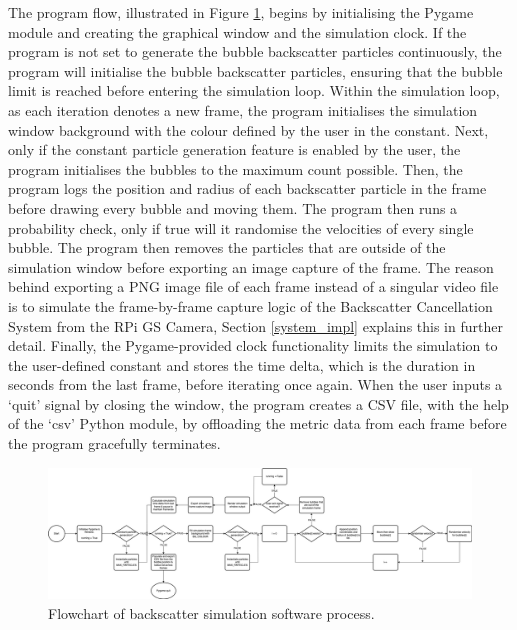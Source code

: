 The program flow, illustrated in Figure \ref{fig:simflow}, begins by initialising the Pygame module and creating the graphical window and the simulation clock. If the program is not set to generate the bubble backscatter particles continuously, the program will initialise the bubble backscatter particles, ensuring that the bubble limit is reached before entering the simulation loop. Within the simulation loop, as each iteration denotes a new frame, the program initialises the simulation window background with the colour defined by the user in the constant. Next, only if the constant particle generation feature is enabled by the user, the program initialises the bubbles to the maximum count possible. Then, the program logs the position and radius of each backscatter particle in the frame before drawing every bubble and moving them. The program then runs a probability check, only if true will it randomise the velocities of every single bubble. The program then removes the particles that are outside of the simulation window before exporting an image capture of the frame. The reason behind exporting a PNG image file of each frame instead of a singular video file is to simulate the frame-by-frame capture logic of the Backscatter Cancellation System from the RPi GS Camera, Section \ref{system_impl} explains this in further detail. Finally, the Pygame-provided clock functionality limits the simulation to the user-defined constant and stores the time delta, which is the duration in seconds from the last frame, before iterating once again. When the user inputs a `quit' signal by closing the window, the program creates a CSV file, with the help of the `csv' Python module, by offloading the metric data from each frame before the program gracefully terminates.

\pagebreak
\begin{landscape}
    \begin{figure}
        \centering
        \includegraphics[width=1\linewidth]{assets/impl-sim_flow.png}
        \caption{Flowchart of backscatter simulation software process.}
        \label{fig:simflow}
    \end{figure}
\end{landscape}
\pagebreak

